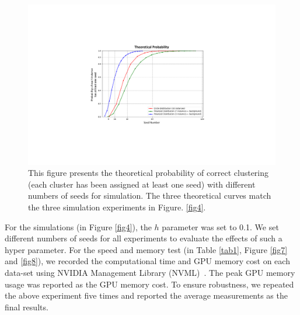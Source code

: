 \documentclass[journal,twoside,web]{ieeecolor}
\begin{document}
\begin{figure}[h]
\centerline{\includegraphics[width=\columnwidth]{9.pdf}}
\caption{This figure presents the theoretical probability of correct clustering (each cluster has been assigned at least one seed) with different numbers of seeds for simulation. The three theoretical curves match the three simulation experiments in Figure. \ref{fig4}.}
\label{fig9}
\end{figure}

For the simulations (in Figure \ref{fig4}), the $h$ parameter was set to 0.1. We set different numbers of seeds for all experiments to evaluate the effects of such a hyper parameter. For the speed and memory test (in Table \ref{tab1}, Figure \ref{fig7} and \ref{fig8}), we recorded the computational time and GPU memory cost on each data-set using NVIDIA Management Library (NVML)~\cite{b38}. The peak GPU memory usage was reported as the GPU memory cost. To ensure robustness, we repeated the above experiment five times and reported the average measurements as the final results. 
\end{document}

